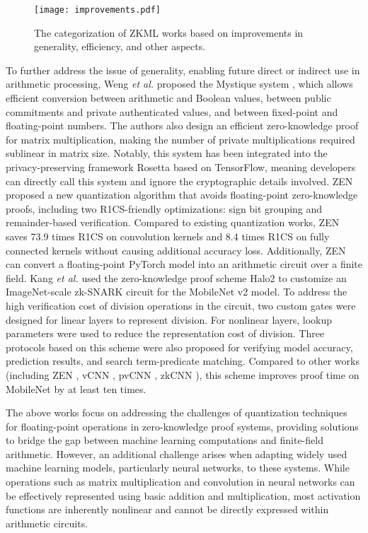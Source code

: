 \documentclass[journal]{IEEEtran}
\begin{document}
\begin{figure*}[t]
    \centering
    \texttt{[image: improvements.pdf]}
    \caption{The categorization of ZKML works based on improvements in generality, efficiency, and other aspects.}
    \label{tab}
\end{figure*}

To further address the issue of generality, enabling future direct or indirect use in arithmetic processing, Weng \emph{et al.} proposed the Mystique system \cite{weng2021mystique}, which allows efficient conversion between arithmetic and Boolean values, between public commitments and private authenticated values, and between fixed-point and floating-point numbers. The authors also design an efficient zero-knowledge proof for matrix multiplication, making the number of private multiplications required sublinear in matrix size. Notably, this system has been integrated into the privacy-preserving framework Rosetta\cite{chen2020rosetta} based on TensorFlow\cite{abadi2016tensorflow}, meaning developers can directly call this system and ignore the cryptographic details involved. ZEN \cite{feng2021zen} proposed a new quantization algorithm that avoids floating-point zero-knowledge proofs, including two R1CS-friendly optimizations: sign bit grouping and remainder-based verification. Compared to existing quantization works, ZEN saves 73.9 times R1CS on convolution kernels and 8.4 times R1CS on fully connected kernels without causing additional accuracy loss. Additionally, ZEN can convert a floating-point PyTorch model into an arithmetic circuit over a finite field. Kang \emph{et al.} \cite{kang2022scaling}  used the zero-knowledge proof scheme Halo2 to customize an ImageNet-scale zk-SNARK circuit for the MobileNet v2 model. To address the high verification cost of division operations in the circuit, two custom gates were designed for linear layers to represent division. For nonlinear layers, lookup parameters were used to reduce the representation cost of division. Three protocols based on this scheme were also proposed for verifying model accuracy, prediction results, and search term-predicate matching. Compared to other works (including ZEN \cite{feng2021zen}, vCNN \cite{lee2024vcnn}, pvCNN \cite{weng2023pvcnn}, zkCNN \cite{liu2021zkcnn}), this scheme improves proof time on MobileNet by at least ten times.

The above works focus on addressing the challenges of quantization techniques for floating-point operations in zero-knowledge proof systems, providing solutions to bridge the gap between machine learning computations and finite-field arithmetic. However, an additional challenge arises when adapting widely used machine learning models, particularly neural networks, to these systems. While operations such as matrix multiplication and convolution in neural networks can be effectively represented using basic addition and multiplication, most activation functions are inherently nonlinear and cannot be directly expressed within arithmetic circuits.
\end{document}
